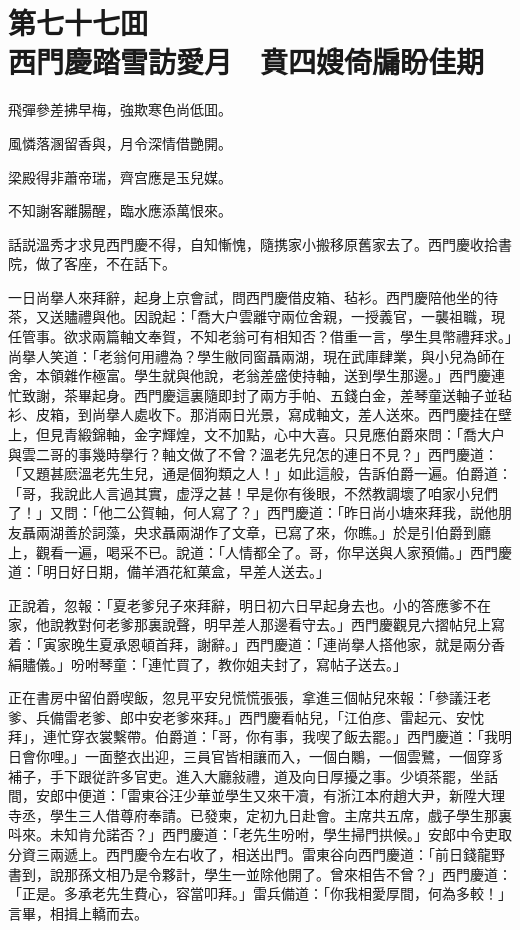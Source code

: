 
\chapter*{第七十七囬　\\西門慶踏雪訪愛月　賁四嫂倚牖盼佳期}
\thispagestyle{empty}

\begin{myquote}
飛彈參差拂早梅，強欺寒色尚低囬。

風憐落溷留香與，月令深情借艷開。

梁殿得非蕭帝瑞，齊宫應是玉兒媒。

不知謝客離腸醒，臨水應添萬恨來。
\end{myquote}

話説溫秀才求見西門慶不得，自知慚愧，隨携家小搬移原舊家去了。西門慶收拾書院，做了客座，不在話下。

一日尚擧人來拜辭，起身上京會試，問西門慶借皮箱、毡衫。西門慶陪他坐的待茶，又送贐禮與他。因說起：「喬大户雲離守兩位舍親，一授義官，一襲祖職，現任管事。欲求兩篇軸文奉賀，不知老翁可有相知否？借重一言，學生具幣禮拜求。」尚擧人笑道：「老翁何用禮為？學生敝同窗聶兩湖，現在武庫肆業，與小兒為師在舍，本領雜作極富。學生就與他說，老翁差盛使持軸，送到學生那邊。」西門慶連忙致謝，茶畢起身。西門慶這裏隨即封了兩方手帕、五錢白金，差琴童送軸子並毡衫、皮箱，到尚擧人處收下。那消兩日光景，寫成軸文，差人送來。西門慶挂在壁上，但見青緞錦軸，金字輝煌，文不加點，心中大喜。只見應伯爵來問：「喬大户與雲二哥的事幾時擧行？軸文做了不曾？溫老先兒怎的連日不見？」西門慶道：「又題甚麽溫老先生兒，通是個狗類之人！」如此這般，告訴伯爵一遍。伯爵道：「哥，我說此人言過其實，虚浮之甚！早是你有後眼，不然教調壞了咱家小兒們了！」又問：「他二公賀軸，何人寫了？」西門慶道：「昨日尚小塘來拜我，説他朋友聶兩湖善於詞藻，央求聶兩湖作了文章，已寫了來，你瞧。」於是引伯爵到廳上，觀看一遍，喝采不已。說道：「人情都全了。哥，你早送與人家預備。」西門慶道：「明日好日期，備羊酒花紅菓盒，早差人送去。」

正說着，忽報：「夏老爹兒子來拜辭，明日初六日早起身去也。小的答應爹不在家，他說教對何老爹那裏說聲，明早差人那邊看守去。」西門慶觀見六摺帖兒上寫着：「寅家晚生夏承恩頓首拜，謝辭。」西門慶道：「連尚擧人搭他家，就是兩分香絹贐儀。」吩咐琴童：「連忙買了，教你姐夫封了，寫帖子送去。」

正在書房中留伯爵喫飯，忽見平安兒慌慌張張，拿進三個帖兒來報：「參議汪老爹、兵備雷老爹、郎中安老爹來拜。」西門慶看帖兒，「江伯彦、雷起元、安忱拜」，連忙穿衣裳繫帶。伯爵道：「哥，你有事，我喫了飯去罷。」西門慶道：「我明日會你哩。」一面整衣出迎，三員官皆相讓而入，一個白鷴，一個雲鷺，一個穿豸補子，手下跟従許多官吏。進入大廳敍禮，道及向日厚擾之事。少頃茶罷，坐話間，安郎中便道：「雷東谷汪少華並學生又來干凟，有浙江本府趙大尹，新陞大理寺丞，學生三人借尊府奉請。已發柬，定初九日赴會。主席共五席，戲子學生那裏呌來。未知肯允諾否？」西門慶道：「老先生吩咐，學生掃門拱候。」安郎中令吏取分資三兩遞上。西門慶令左右收了，相送出門。雷東谷向西門慶道：「前日錢龍野書到，說那孫文相乃是令夥計，學生一並除他開了。曾來相告不曾？」西門慶道：「正是。多承老先生費心，容當叩拜。」雷兵備道：「你我相愛厚間，何為多較！」言畢，相揖上轎而去。

